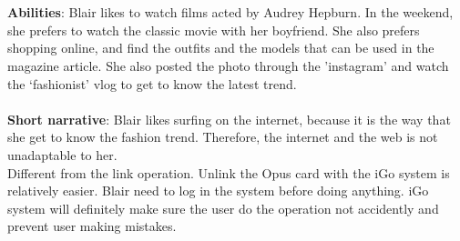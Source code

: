 \documentclass[11pt, english]{report}
\begin{document}
\\\\
\textbf{Abilities}: Blair likes to watch films acted by Audrey Hepburn. In the weekend, she prefers to watch the classic movie with her boyfriend. She also prefers shopping online, and find the outfits and the models that can be used in the magazine article. She also posted the photo through the 'instagram' and watch the ‘fashionist’ vlog to get to know the latest trend. 
\\\\
\textbf{Short narrative}: Blair likes surfing on the internet, because it is the way that she get to know the fashion trend. Therefore, the internet and the web is not unadaptable to her. \\

Different from the link operation. Unlink the Opus card with the iGo system is relatively easier. Blair need to log in the system before doing anything. iGo system will definitely make sure the user do the operation not accidently and prevent user making mistakes.
\clearpage
\end{document}
